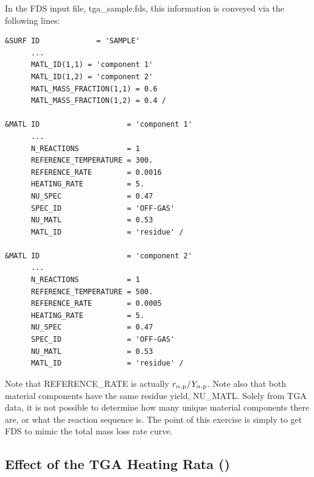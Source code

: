 \documentclass[11pt]{book}
\begin{document}
In the FDS input file, {\ct tga\_sample.fds}, this information is conveyed via the following lines:
\begin{lstlisting}
&SURF ID             = 'SAMPLE'
      ...
      MATL_ID(1,1) = 'component 1'
      MATL_ID(1,2) = 'component 2'
      MATL_MASS_FRACTION(1,1) = 0.6
      MATL_MASS_FRACTION(1,2) = 0.4 /

&MATL ID                    = 'component 1'
      ...
      N_REACTIONS           = 1
      REFERENCE_TEMPERATURE = 300.
      REFERENCE_RATE        = 0.0016
      HEATING_RATE          = 5.
      NU_SPEC               = 0.47
      SPEC_ID               = 'OFF-GAS'
      NU_MATL               = 0.53
      MATL_ID               = 'residue' /

&MATL ID                    = 'component 2'
      ...
      N_REACTIONS           = 1
      REFERENCE_TEMPERATURE = 500.
      REFERENCE_RATE        = 0.0005
      HEATING_RATE          = 5.
      NU_SPEC               = 0.47
      SPEC_ID               = 'OFF-GAS'
      NU_MATL               = 0.53
      MATL_ID               = 'residue' /
\end{lstlisting}
Note that {\ct REFERENCE\_RATE} is actually $r_{\alpha,{\rm p}}/Y_{\alpha,{\rm p}}$. Note also that both material components have the same residue yield, {\ct NU\_MATL}. Solely from TGA data, it is not possible to determine how many unique material components there are, or what the reaction sequence is. The point of this exercise is simply to get FDS to mimic the total mass loss rate curve.


\subsection{Effect of the TGA Heating Rata (\texorpdfstring{}{birch\_tga})}
\label{birch_tga}
\end{document}
